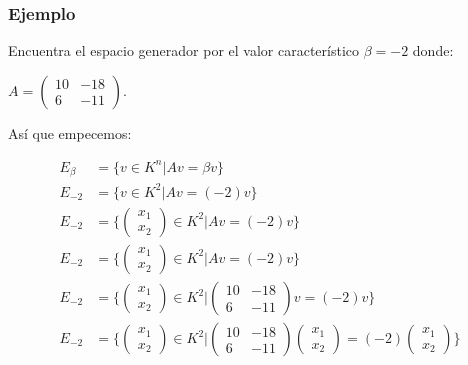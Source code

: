 \documentclass[12pt]{report}                                %
\begin{document}
            \clearpage
            \subsubsection{Ejemplo}
            Encuentra el espacio generador por el valor característico 
            $\beta = -2$ donde:

            $A = \begin{pmatrix}10&-18\\6&-11\end{pmatrix}$.

            Así que empecemos:

            \begin{equation*}
            \begin{split}
                E_{\beta} &= \{v \in K^n | Av = \beta v \}  \\
                E_{-2} &= \{v \in K^2 | Av = (-2) v \} \\
                E_{-2} &= \{ \begin{pmatrix}x_1\\x_2\end{pmatrix} \in K^2 | Av = (-2) v \} \\
                E_{-2} &= \{ \begin{pmatrix}x_1\\x_2\end{pmatrix} \in K^2 | Av = (-2) v \} \\
                E_{-2} &= \{ \begin{pmatrix}x_1\\x_2\end{pmatrix} \in K^2 |
                \begin{pmatrix}10&-18\\6&-11\end{pmatrix}v = (-2) v \} \\
                E_{-2} &= \{ \begin{pmatrix}x_1\\x_2\end{pmatrix} \in K^2 |
                \begin{pmatrix}10&-18\\6&-11\end{pmatrix}  \begin{pmatrix}x_1\\x_2\end{pmatrix} 
                = (-2) \begin{pmatrix}x_1\\x_2\end{pmatrix} \} \\

\end{split}
\end{equation*}
\end{document}
